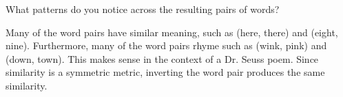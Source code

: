 \problem[2]
What patterns do you notice across the resulting pairs of words?
\begin{solution}
	Many of the word pairs have similar meaning, such as (here, there) and (eight, nine). Furthermore, many of the word pairs rhyme such as (wink, pink) and (down, town). This makes sense in the context of a Dr. Seuss poem. Since similarity is a symmetric metric, inverting the word pair produces the same similarity.
\end{solution}



